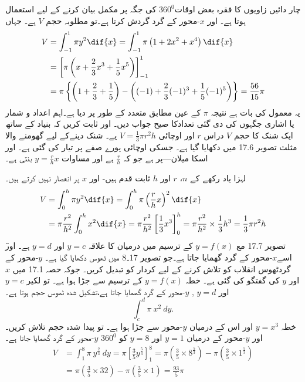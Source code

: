 چار دائیں زاویوں کا فقرہ بعض اوقات\(360^0\) کی جگہ پر مکمل بیان کرنے کے لیے استعمال ہوتا ہے۔ اور \(x\)-محور کے گرد گردش کرتا ہے۔تو مطلوبہ حجم \(V\) ہے۔ جہاں
\begin{align*}
V&=\int_{-1}^{1}\pi y^{2}\dif{x}=\int_{-1}^{1}\pi\left(1+2x^{2}+x^4\right)\dif{x}\\
&=\left[\pi\left(x+\frac{2}{3}x^{3}+\frac{1}{5}x^{5}\right)\right]_{-1}^{1}\\
&=\pi\left\{\left(1+\frac{2}{3}+\frac{1}{5}\right)-\left((-1)+\frac{2}{3}(-1)^{3}+\frac{1}{5}(-1)^{5}\right)\right\}=\frac{56}{15}\pi
\end{align*}
یہ معمول کی بات ہے نتیجہ \(\pi\) کے عین مطابق متعدد کے طور پر دیا ہے۔اہم اعداد و شمار یا اشاری جگہوں کی دی گئی تعدادکا صیح جواب دیں۔ اور ثابت کریں کہ بنیاد کے ساتھ ایک شنک کا حجم \(V\) دراس \(r\) اور اوچائی \(V=\frac{1}{3}\pi r^{2}h\) یے۔
شنک دینےکے لیے گھومنے والا مثلث تصویر 17.6 میں دکھایا گیا ہے۔ جسکی اوچائی پورے صفے پر تیار کی گئی ہے۔ اور اسکا میلان---پر ہے جو کہ \(\frac{r}{h}\) ہے اور مساوات \(y=\frac{r}{h}x\) بنتی ہے۔

لہزا یاد رکھے کے \(n\)، \(r\) اور \(h\) ثابت قدم ہیں- اور \(x\) پر انعصار نہیں کرتے ہیں۔
\begin{align*}
V&=\int_{0}^{h}\pi y^{2}\dif{x}=\int_{0}^{h}\pi\left(\frac{r}{h}x\right)^{2}\dif{x}\\
&=\pi\frac{r^{2}}{h^{2}}\int_{0}^{h}x^{2}\dif{x}=\pi\frac{r^{2}}{h^{2}}\left[\frac{1}{3}x^{3}\right]_{0}^{h}=\pi\frac{r^{2}}{h^{2}}\times\frac{1}{3}h^{3}=\frac{1}{3}\pi r^{2}h
\end{align*}
ٓتصویر 17.7 مع \(y=f(x)\) کے ترسیم میں درمیان کا علاقہ \(y=c\) اور \(y=d\) ہے۔ اور اسے\(x\)-محور کے گرد گھمایا جاتا ہے۔جو تصویر 17۔8 میں ٹھوس دکھایا گیا ہے۔ \(y\)-محور کے گردٹھوس انقلاب کو تلاش کرنے کے لیے کردار کو تبدیل کریں۔ جوکہ حصہ 17.1 میں \(x\) اور \(y\) کی گفتگو کی گئی ہے۔
خطہ \(y=f(x)\) کے ترسیم سے جڑا ہوا ہے۔ تو لکیر \(y=c\)  اور \(y=d\) , \(y\)-محور کے گرد گھمایا جاتا ہے،تشکیل شدہ ٹھوس حجم ہوتا ہے۔
\[\int_{c}^{d} \pi \ x^{2} \ dy.\]
خطہ \(y=x^{3}\) اور اس کے درمیان \(y\)-محور سے جڑا ہوا ہے۔ تو پیدا شدہ حجم تلاش کریں۔ اور \(y\)-محور کے درمیان  \(y=1\) اور \(y=8\) کو   \(360^0\)  \(y\)-محور کے گرد گھمایا جاتا ہے۔
\begin{align*}
V&=\int_{1}^{8} \pi \ y^\frac {2}{3} \ dy =\pi [\frac {3}{5} y^\frac {5}{3}]_{1}^{8} =\pi(\frac{3}{5}\times 8^\frac{5}{3}) - \pi(\frac{3}{5}\times 1^\frac{5}{3})\\
&= \pi (\frac {3}{5}\times 32)-\pi(\frac{3}{5}\times 1)=\frac{93}{5}\pi\\
\end{align*}

